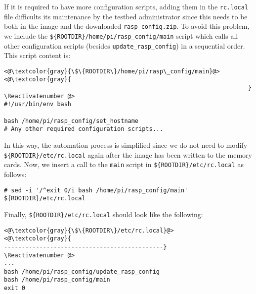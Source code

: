 
If it is required to have more configuration scripts, adding them
in the \texttt{rc.local} file difficults its maintenance by the testbed
administrator since this needs to be both in the image and the
downloaded \texttt{rasp\_config.zip}. To avoid this problem, we include
the \texttt{\$\{ROOTDIR\}/home/pi/rasp\_config/main} script which
calls all other configuration scripts (besides \texttt{update\_rasp\_config})
in a sequential order. This script content is:

\Suppressnumber\begin{lstlisting}[]
<@\textcolor{gray}{\$\{ROOTDIR\}/home/pi/rasp\_config/main}@>
<@\textcolor{gray}{
---------------------------------------------------------------------}
\Reactivatenumber @>
#!/usr/bin/env bash

bash /home/pi/rasp_config/set_hostname
# Any other required configuration scripts...
\end{lstlisting}
\FloatBarrier
\vspace{-5mm}

In this way, the automation process is simplified since we do not need to
modify \texttt{\$\{ROOTDIR\}/etc/rc.local} again after the image has been
written to the memory cards.
Now, we insert a call to the \texttt{main} script in \texttt{\$\{ROOTDIR\}/etc/rc.local} as follows:

\Suppressnumber\begin{lstlisting}[]
# sed -i '/^exit 0/i bash /home/pi/rasp_config/main' ${ROOTDIR}/etc/rc.local
\end{lstlisting}
\FloatBarrier
\vspace{-5mm}

Finally, \texttt{\$\{ROOTDIR\}/etc/rc.local} should look like the following:

\Suppressnumber\begin{lstlisting}[]
<@\textcolor{gray}{\$\{ROOTDIR\}/etc/rc.local}@>
<@\textcolor{gray}{
---------------------------------------------}
\Reactivatenumber @>
...
bash /home/pi/rasp_config/update_rasp_config
bash /home/pi/rasp_config/main
exit 0
\end{lstlisting}
\FloatBarrier
\vspace{-5mm}

